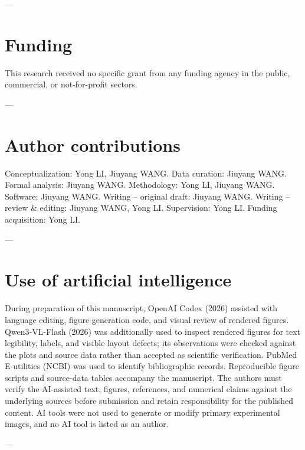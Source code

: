 \documentclass[a4paper,fleqn]{cas-sc}
\begin{document}
---

\section*{Funding}
This research received no specific grant from any funding agency in the public, commercial, or not-for-profit sectors.

---

\section*{Author contributions}
Conceptualization: Yong LI, Jiuyang WANG. Data curation: Jiuyang WANG. Formal analysis: Jiuyang WANG. Methodology: Yong LI, Jiuyang WANG. Software: Jiuyang WANG. Writing -- original draft: Jiuyang WANG. Writing -- review \& editing: Jiuyang WANG, Yong LI. Supervision: Yong LI. Funding acquisition: Yong LI.

---

\section*{Use of artificial intelligence}
During preparation of this manuscript, OpenAI Codex (2026) assisted with language editing, figure-generation code, and visual review of rendered figures. Qwen3-VL-Flash (2026) was additionally used to inspect rendered figures for text legibility, labels, and visible layout defects; its observations were checked against the plots and source data rather than accepted as scientific verification. PubMed E-utilities (NCBI) was used to identify bibliographic records. Reproducible figure scripts and source-data tables accompany the manuscript. The authors must verify the AI-assisted text, figures, references, and numerical claims against the underlying sources before submission and retain responsibility for the published content. AI tools were not used to generate or modify primary experimental images, and no AI tool is listed as an author.

---
\end{document}
